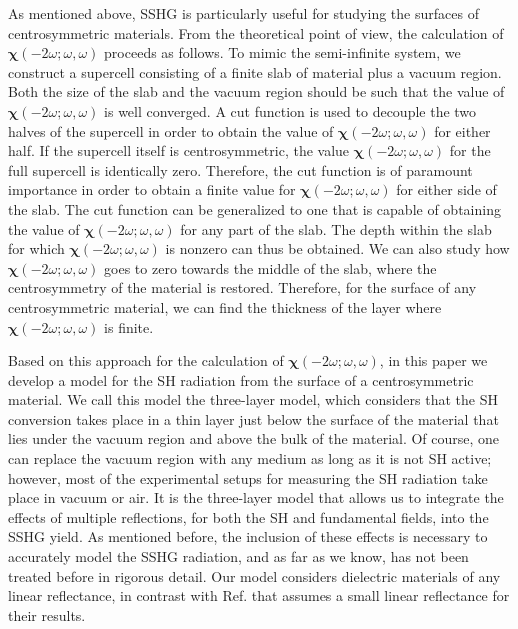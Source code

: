 \documentclass[aps,prb,10pt,showpacs,letterpaper,twocolumn]{revtex4-1}
\begin{document}
As mentioned above, SSHG is particularly useful for studying the surfaces of
centrosymmetric materials. From the theoretical point of view, the calculation
of $\boldsymbol{\chi}(-2\omega;\omega,\omega)$ proceeds as follows. To mimic the
semi-infinite system, we construct a supercell consisting of a finite slab of
material plus a vacuum region. Both the size of the slab and the vacuum region
should be such that the value of $\boldsymbol{\chi}(-2\omega;\omega,\omega)$ is
well converged.  A cut function is used to decouple the two halves of the
supercell in order to obtain the value of
$\boldsymbol{\chi}(-2\omega;\omega,\omega)$ for either half. If the supercell
itself is centrosymmetric, the value $\boldsymbol{\chi}(-2\omega;\omega,\omega)$
for the full supercell is identically zero. Therefore, the cut function is of
paramount importance in order to obtain a finite value for
$\boldsymbol{\chi}(-2\omega;\omega,\omega)$ for either side of the
slab.\cite{reiningPRB94,andersonPRB15,andersonPRB16} The cut function can be
generalized to one that is capable of obtaining the value of
$\boldsymbol{\chi}(-2\omega;\omega,\omega)$ for any part of the slab. The depth
within the slab for which $\boldsymbol{\chi}(-2\omega;\omega,\omega)$ is nonzero
can thus be obtained. We can also study how
$\boldsymbol{\chi}(-2\omega;\omega,\omega)$ goes to zero towards the middle of
the slab, where the centrosymmetry of the material is restored.\cite{mejiaRMF04}
Therefore, for the surface of any centrosymmetric material, we can find the
thickness of the layer where $\boldsymbol{\chi}(-2\omega;\omega,\omega)$ is
finite.

Based on this approach for the calculation of
$\boldsymbol{\chi}(-2\omega;\omega,\omega)$, in this paper we develop a model
for the SH radiation from the surface of a centrosymmetric material. We call
this model the three-layer model, which considers that the SH conversion takes
place in a thin layer just below the surface of the material that lies under the
vacuum region and above the bulk of the material. Of course, one can replace the
vacuum region with any medium as long as it is not SH active; however, most of
the experimental setups for measuring the SH radiation take place in vacuum or
air.
{\color{red}
It is the three-layer model that allows us to integrate the effects of multiple
reflections, for both the SH and fundamental fields, into the SSHG yield. As
mentioned before, the inclusion of these effects is necessary to accurately
model the SSHG radiation, and as far as we know, has not been treated before in
rigorous detail. Our model considers dielectric materials of any linear
reflectance, in contrast with Ref.  that assumes a
small linear reflectance for their results.
}
\end{document}
